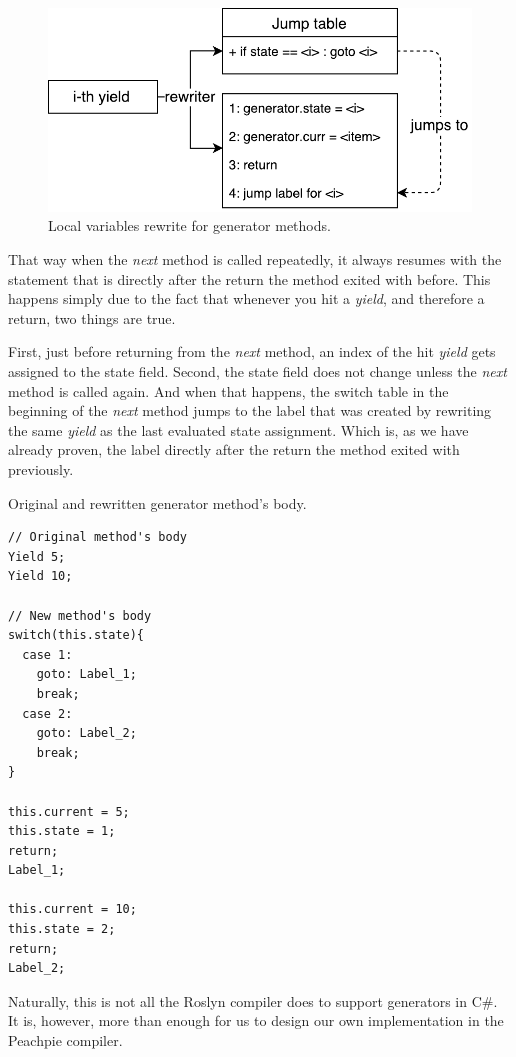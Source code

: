 \begin{figure}[h]
	\centering	
	\includegraphics[scale=0.75]{../img/4_1_position}	
	\caption{Local variables rewrite for generator methods.}
	\label{fig4.1:Position}
\end{figure}

That way when the \emph{next} method is called repeatedly, it always resumes with the statement that is directly after the return the method exited with before. This happens simply due to the fact that whenever you hit a \emph{yield}, and therefore a return, two things are true. 

First, just before returning from the \emph{next} method, an index of the hit \emph{yield} gets assigned to the state field. Second, the state field does not change unless the \emph{next} method is called again. And when that happens, the switch table in the beginning of the \emph{next} method jumps to the label that was created by rewriting the same \emph{yield} as the last evaluated state assignment. Which is, as we have already proven, the label directly after the return the method exited with previously.

\begin{listing}[H]
\caption{Original and rewritten generator method's body.}
\label{list4.1:generatorRewrite}
\begin{verbatim}
// Original method's body
Yield 5;
Yield 10;

// New method's body
switch(this.state){
  case 1:
    goto: Label_1;
    break;
  case 2:
    goto: Label_2;
    break;
}

this.current = 5;
this.state = 1;
return;
Label_1;

this.current = 10;
this.state = 2;
return;
Label_2;
\end{verbatim}
\end{listing}

Naturally, this is not all the Roslyn compiler does to support generators in C\#. It is, however, more than enough for us to design our own implementation in the Peachpie compiler. 


